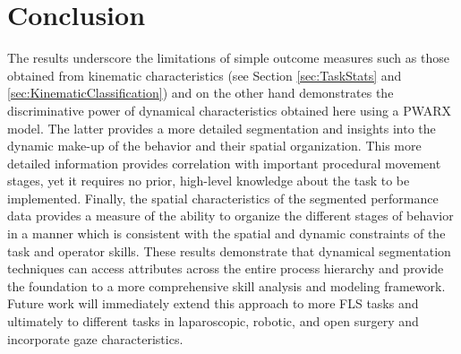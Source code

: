 \documentclass{llncs}
\begin{document}
\section{Conclusion} \label{sec:conclusion}
The results underscore the limitations of simple outcome measures such as those obtained from kinematic characteristics (see Section \ref{sec:TaskStats} and \ref{sec:KinematicClassification}) and on the other hand demonstrates the discriminative power of dynamical characteristics obtained here using a PWARX model. The latter provides a more detailed segmentation and insights into the dynamic make-up of the behavior and their spatial organization. This more detailed information provides correlation with important procedural movement stages, yet it requires no prior, high-level knowledge about the task to be implemented. Finally, the spatial characteristics of the segmented performance data provides a measure of the ability to organize the different stages of behavior in a manner which is consistent with the spatial and dynamic constraints of the task and operator skills. These results demonstrate that dynamical segmentation techniques can access attributes across the entire process hierarchy and provide the foundation to a more comprehensive skill analysis and modeling framework. Future work will immediately extend this approach to more FLS tasks and ultimately to different tasks in laparoscopic, robotic, and open surgery and incorporate gaze characteristics.



\end{document}
